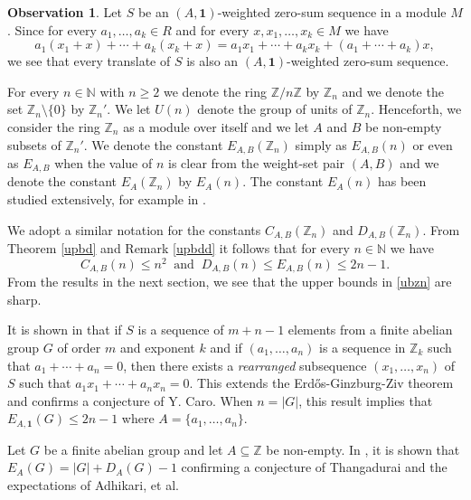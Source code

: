 \documentclass{article}[11pt]
\theoremstyle{definition}
\newtheorem{observation}[theorem]{Observation}
\begin{document}
\begin{observation}\label{tr}
Let $S$ be an $(A,\mathbf 1)$-weighted zero-sum sequence in a module $M$. Since for every $a_1,\ldots,a_k\in R$ and for every $x,x_1,\ldots,x_k\in M$ we have
\[a_1(x_1+x)+\cdots+a_k(x_k+x)=a_1x_1+\cdots +a_kx_k+(a_1+\cdots+a_k)x,\]
we see that every translate of $S$ is also an $(A,\mathbf 1)$-weighted zero-sum sequence.
\end{observation}

For every $n\in \mathbb N$ with $n\geq 2$ we denote the ring $\mathbb Z/n\mathbb Z$ by $\mathbb Z_n$ and we denote the set $\mathbb Z_n\setminus\{0\}$ by $\mathbb Z_n'$. We let $U(n)$ denote the group of units of $\mathbb Z_n$.  Henceforth, we consider the ring $\mathbb Z_n$ as a module over itself and we let $A$ and $B$ be non-empty subsets of $\mathbb Z_n'$. We denote the constant $E_{A,B}(\mathbb Z_n)$ simply as $E_{A,B}(n)$ or even as $E_{A,B}$ when the value of $n$ is clear from the weight-set pair $(A,B)$ and we denote the constant $E_A(\mathbb Z_n)$ by $E_A(n)$. The constant $E_A(n)$ has been studied extensively, for example in \cite{ACFKP}.

We adopt a similar notation for the constants $C_{A,B}(\mathbb Z_n)$ and $D_{A,B}(\mathbb Z_n)$. From Theorem \ref{upbd} and Remark \ref{upbdd} it follows that for every $n\in \mathbb N$ we have
\begin{equation}\label{ubzn}
C_{A,B}(n)\leq n^2 ~\mbox{ and }~ D_{A,B}(n)\leq E_{A,B}(n)\leq 2n-1.
\end{equation}
From the results in the next section, we see that the upper bounds in \eqref{ubzn} are sharp.

It is shown in \cite{Gr} that if $S$ is a sequence of $m+n-1$ elements from a finite abelian group $G$ of order $m$ and exponent $k$ and if $(a_1,\ldots,a_n)$ is a sequence in $\mathbb Z_k$ such that $a_1+\cdots +a_n=0$, then there exists a {\it rearranged} subsequence $(x_1,\ldots,x_n)$ of $S$ such that $a_1x_1+\cdots+a_nx_n=0$. This extends the Erd\H{o}s-Ginzburg-Ziv theorem and confirms a conjecture of Y. Caro. When $n=|G|$, this result implies that $E_{A,\mathbf 1}(G)\leq 2n-1$ where $A=\{a_1,\ldots,a_n\}$.

Let $G$ be a finite abelian group and let $A\subseteq \mathbb Z$ be non-empty. In \cite{GMO}, it is shown that $E_A(G)=|G|+D_A(G)-1$ confirming a conjecture of Thangadurai and the expectations of Adhikari, et al.
\end{document}
